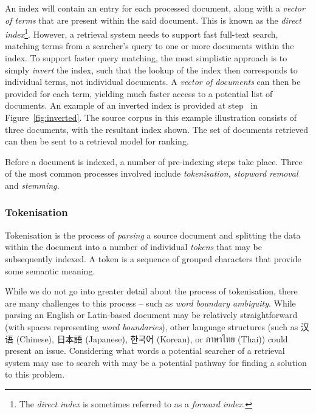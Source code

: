 An index will contain an entry for each processed document, along with a \emph{vector of terms} that are present within the said document. This is known as the \emph{direct index}\footnote{The \emph{direct index} is sometimes referred to as a \emph{forward index.}}. However, a retrieval system needs to support fast full-text search, matching terms from a searcher's query to one or more documents within the index. To support faster query matching, the most simplistic approach is to simply \emph{invert} the index, such that the lookup of the index then corresponds to individual terms, not individual documents. A \emph{vector of documents} can then be provided for each term, yielding much faster access to a potential list of documents. An example of an inverted index is provided at step~ in Figure~\ref{fig:inverted}. The source corpus in this example illustration consists of three documents, with the resultant index shown. The set of documents retrieved can then be sent to a retrieval model for ranking.

Before a document is indexed, a number of pre-indexing steps take place. Three of the most common processes involved include \emph{tokenisation,} \emph{stopword removal} and \emph{stemming.}

\vspace*{-2mm}
\subsubsection{Tokenisation}
Tokenisation is the process of \emph{parsing} a source document and splitting the data within the document into a number of individual \emph{tokens} that may be subsequently indexed. A token is a sequence of grouped characters that provide some semantic meaning.

While we do not go into greater detail about the process of tokenisation, there are many challenges to this process -- such as \emph{word boundary ambiguity}. While parsing an English or Latin-based document may be relatively straightforward (with spaces representing \emph{word boundaries}), other language structures (such as {\asianfont 汉语} (Chinese), {\asianfont 日本語} (Japanese), {\asianfont 한국어} (Korean), or {\thaifont ภาษาไทย} (Thai)) could present an issue. Considering what words a potential searcher of a retrieval system may use to search with may be a potential pathway for finding a solution to this problem.

